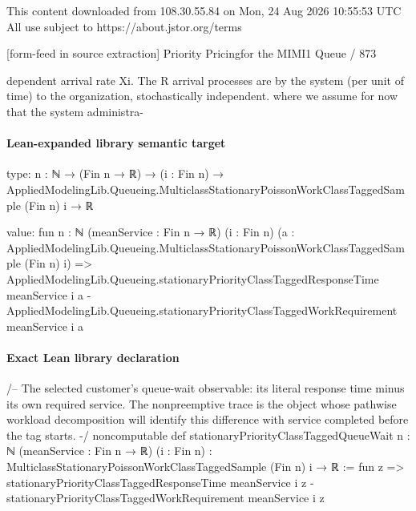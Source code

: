 \documentclass[10pt]{article}
\begin{document}
\begin{ReviewVerbatim}
                                                 This content downloaded from
                               108.30.55.84 on Mon, 24 Aug 2026 10:55:53 UTC
                                         All use subject to https://about.jstor.org/terms

[form-feed in source extraction]
                                                                                Priority Pricingfor the MIMI1 Queue / 873

dependent arrival rate Xi. The R arrival processes are                 by the system (per unit of time) to the organization,
stochastically independent.                                            where we assume for now that the system administra-
\end{ReviewVerbatim}



\paragraph{Lean-expanded library semantic target}
\begin{ReviewVerbatim}
type:
{n : ℕ} →
  (Fin n → ℝ) → (i : Fin n) → AppliedModelingLib.Queueing.MulticlassStationaryPoissonWorkClassTaggedSample (Fin n) i → ℝ

value:
fun {n : ℕ} (meanService : Fin n → ℝ) (i : Fin n)
    (a : AppliedModelingLib.Queueing.MulticlassStationaryPoissonWorkClassTaggedSample (Fin n) i) =>
  AppliedModelingLib.Queueing.stationaryPriorityClassTaggedResponseTime meanService i a -
    AppliedModelingLib.Queueing.stationaryPriorityClassTaggedWorkRequirement meanService i a
\end{ReviewVerbatim}

\paragraph{Exact Lean library declaration}
\begin{ReviewVerbatim}
/-- The selected customer's queue-wait observable: its literal response time
minus its own required service.  The nonpreemptive trace is the object whose
pathwise workload decomposition will identify this difference with service
completed before the tag starts. -/
noncomputable def stationaryPriorityClassTaggedQueueWait
    {n : ℕ} (meanService : Fin n → ℝ) (i : Fin n) :
    MulticlassStationaryPoissonWorkClassTaggedSample (Fin n) i → ℝ :=
  fun z => stationaryPriorityClassTaggedResponseTime meanService i z -
    stationaryPriorityClassTaggedWorkRequirement meanService i z
\end{ReviewVerbatim}
\end{document}
